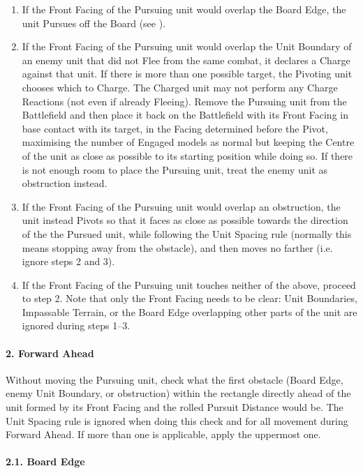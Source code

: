 \begin{enumerate}
\item If the Front Facing of the Pursuing unit would overlap the Board Edge, the unit Pursues off the Board (see ).
\item If the Front Facing of the Pursuing unit would overlap the Unit Boundary of an enemy unit that did not Flee from the same combat, it declares a Charge against that unit. If there is more than one possible target, the Pivoting unit chooses which to Charge. The Charged unit may not perform any Charge Reactions (not even if already Fleeing). Remove the Pursuing unit from the Battlefield and then place it back on the Battlefield with its Front Facing in base contact with its target, in the Facing determined before the Pivot, maximising the number of Engaged models as normal but keeping the Centre of the unit as close as possible to its starting position while doing so. If there is not enough room to place the Pursuing unit, treat the enemy unit as obstruction instead.
\item If the Front Facing of the Pursuing unit would overlap an obstruction, the unit instead Pivots so that it faces as close as possible towards the direction of the the Pursued unit, while following the Unit Spacing rule (normally this means stopping  away from the obstacle), and then moves no farther (i.e. ignore steps 2 and 3).
\item If the Front Facing of the Pursuing unit touches neither of the above, proceed to step 2. Note that only the Front Facing needs to be clear: Unit Boundaries, Impassable Terrain, or the Board Edge overlapping other parts of the unit are ignored during steps 1--3.
\end{enumerate}

\paragraph{2. Forward Ahead}

Without moving the Pursuing unit, check what the first obstacle (Board Edge, enemy Unit Boundary, or obstruction) within the rectangle directly ahead of the unit formed by its Front Facing and the rolled Pursuit Distance would be. The Unit Spacing rule is ignored when doing this check and for all movement during Forward Ahead. If more than one is applicable, apply the uppermost one.

\paragraph{2.1. Board Edge}

